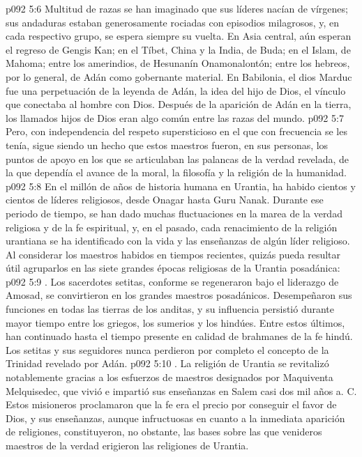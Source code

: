 \vs p092 5:6 Multitud de razas se han imaginado que sus líderes nacían de vírgenes; sus andaduras estaban generosamente rociadas con episodios milagrosos, y, en cada respectivo grupo, se espera siempre su vuelta. En Asia central, aún esperan el regreso de Gengis Kan; en el Tíbet, China y la India, de Buda; en el Islam, de Mahoma; entre los amerindios, de Hesunanín Onamonalontón; entre los hebreos, por lo general, de Adán como gobernante material. En Babilonia, el dios Marduc fue una perpetuación de la leyenda de Adán, la idea del hijo de Dios, el vínculo que conectaba al hombre con Dios. Después de la aparición de Adán en la tierra, los llamados hijos de Dios eran algo común entre las razas del mundo.
\vs p092 5:7 Pero, con independencia del respeto supersticioso en el que con frecuencia se les tenía, sigue siendo un hecho que estos maestros fueron, en sus personas, los puntos de apoyo en los que se articulaban las palancas de la verdad revelada, de la que dependía el avance de la moral, la filosofía y la religión de la humanidad.
\vs p092 5:8 En el millón de años de historia humana en Urantia, ha habido cientos y cientos de líderes religiosos, desde Onagar hasta Guru Nanak. Durante ese periodo de tiempo, se han dado muchas fluctuaciones en la marea de la verdad religiosa y de la fe espiritual, y, en el pasado, cada renacimiento de la religión urantiana se ha identificado con la vida y las enseñanzas de algún líder religioso. Al considerar los maestros habidos en tiempos recientes, quizás pueda resultar útil agruparlos en las siete grandes épocas religiosas de la Urantia posadánica:
\vs p092 5:9 . Los sacerdotes setitas, conforme se regeneraron bajo el liderazgo de Amosad, se convirtieron en los grandes maestros posadánicos. Desempeñaron sus funciones en todas las tierras de los anditas, y su influencia persistió durante mayor tiempo entre los griegos, los sumerios y los hindúes. Entre estos últimos, han continuado hasta el tiempo presente en calidad de brahmanes de la fe hindú. Los setitas y sus seguidores nunca perdieron por completo el concepto de la Trinidad revelado por Adán.
\vs p092 5:10 . La religión de Urantia se revitalizó notablemente gracias a los esfuerzos de maestros designados por Maquiventa Melquisedec, que vivió e impartió sus enseñanzas en Salem casi dos mil años a. C. Estos misioneros proclamaron que la fe era el precio por conseguir el favor de Dios, y sus enseñanzas, aunque infructuosas en cuanto a la inmediata aparición de religiones, constituyeron, no obstante, las bases sobre las que venideros maestros de la verdad erigieron las religiones de Urantia.
